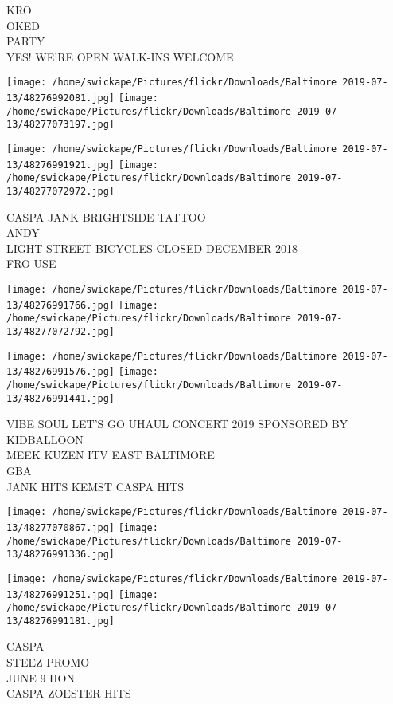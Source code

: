 \documentclass[10pt,letterpaper]{article}
\begin{document}
KRO\\
OKED\\
PARTY\\
YES!  WE'RE OPEN WALK{-}INS WELCOME
\pagebreak

\texttt{[image: /home/swickape/Pictures/flickr/Downloads/Baltimore 2019-07-13/48276992081.jpg]}
\texttt{[image: /home/swickape/Pictures/flickr/Downloads/Baltimore 2019-07-13/48277073197.jpg]}

\texttt{[image: /home/swickape/Pictures/flickr/Downloads/Baltimore 2019-07-13/48276991921.jpg]}
\texttt{[image: /home/swickape/Pictures/flickr/Downloads/Baltimore 2019-07-13/48277072972.jpg]}

CASPA JANK BRIGHTSIDE TATTOO\\
ANDY\\
LIGHT STREET BICYCLES CLOSED DECEMBER 2018\\
FRO USE
\pagebreak

\texttt{[image: /home/swickape/Pictures/flickr/Downloads/Baltimore 2019-07-13/48276991766.jpg]}
\texttt{[image: /home/swickape/Pictures/flickr/Downloads/Baltimore 2019-07-13/48277072792.jpg]}

\texttt{[image: /home/swickape/Pictures/flickr/Downloads/Baltimore 2019-07-13/48276991576.jpg]}
\texttt{[image: /home/swickape/Pictures/flickr/Downloads/Baltimore 2019-07-13/48276991441.jpg]}

VIBE SOUL LET'S GO UHAUL CONCERT 2019 SPONSORED BY KIDBALLOON\\
MEEK KUZEN ITV EAST BALTIMORE\\
GBA\\
JANK HITS KEMST CASPA HITS
\pagebreak

\texttt{[image: /home/swickape/Pictures/flickr/Downloads/Baltimore 2019-07-13/48277070867.jpg]}
\texttt{[image: /home/swickape/Pictures/flickr/Downloads/Baltimore 2019-07-13/48276991336.jpg]}

\texttt{[image: /home/swickape/Pictures/flickr/Downloads/Baltimore 2019-07-13/48276991251.jpg]}
\texttt{[image: /home/swickape/Pictures/flickr/Downloads/Baltimore 2019-07-13/48276991181.jpg]}

CASPA\\
STEEZ PROMO\\
JUNE 9 HON\\
CASPA ZOESTER HITS
\pagebreak
\end{document}
